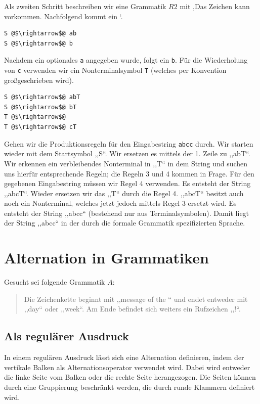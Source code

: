 Als zweiten Schritt beschreiben wir eine Grammatik $R2$ mit ,Das Zeichen  kann vorkommen. Nachfolgend kommt ein `.
\begin{lstlisting}
S @$\rightarrow$@ ab
S @$\rightarrow$@ b
\end{lstlisting}

Nachdem ein optionales \texttt{a} angegeben wurde, folgt ein \texttt{b}. Für die Wiederholung von \texttt{c} verwenden wir ein Nonterminalsymbol \texttt{T} (welches per Konvention großgeschrieben wird).
\begin{lstlisting}
S @$\rightarrow$@ abT
S @$\rightarrow$@ bT
T @$\rightarrow$@
T @$\rightarrow$@ cT
\end{lstlisting}

Gehen wir die Produktionsregeln für den Eingabestring \texttt{abcc} durch. Wir starten wieder mit dem Startsymbol ,,S``. Wir ersetzen es mittels der 1. Zeile zu ,,abT``. Wir erkennen ein verbleibendes Nonterminal in ,,T`` in dem String und suchen uns hierfür entsprechende Regeln; die Regeln 3 und 4 kommen in Frage. Für den gegebenen Eingabestring müssen wir Regel 4 verwenden. Es entsteht der String ,,abcT``. Wieder ersetzen wir das ,,T`` durch die Regel 4. ,,abcT`` besitzt auch noch ein Nonterminal, welches jetzt jedoch mittels Regel 3 ersetzt wird. Es entsteht der String ,,abcc`` (bestehend nur aus Terminalsymbolen). Damit liegt der String ,,abcc`` in der durch die formale Grammatik spezifizierten Sprache.

\section{Alternation in Grammatiken}
%
Gesucht sei folgende Grammatik $A$:
\begin{quote}
  Die Zeichenkette beginnt mit ,,message of the `` und endet entweder mit ,,day`` oder ,,week``. Am Ende befindet sich weiters ein Rufzeichen ,,{!}``.
\end{quote}

\subsection{Als regulärer Ausdruck}
%
In einem regulären Ausdruck lässt sich eine Alternation definieren, indem der vertikale Balken als Alternationsoperator verwendet wird. Dabei wird entweder die linke Seite vom Balken oder die rechte Seite herangezogen. Die Seiten können durch eine Gruppierung beschränkt werden, die durch runde Klammern definiert wird.

